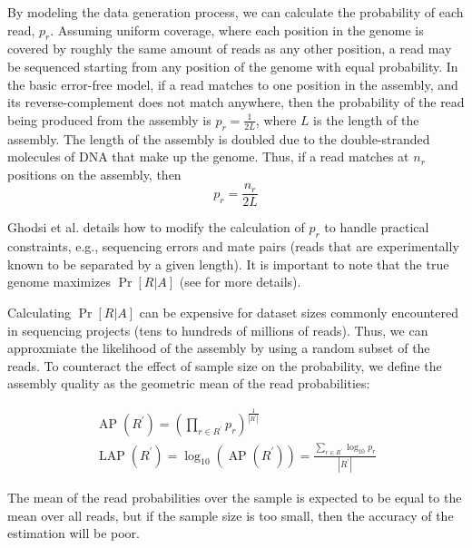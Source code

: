 \documentclass[conference]{IEEEtran}
\begin{document}
By modeling the data generation process, we can calculate the probability of each read, $p_r$.
Assuming uniform coverage, where each position in the genome is covered by roughly the same amount of reads as any other position, a read may be sequenced starting from any position of the genome with equal probability.
In the basic error-free model, if a read matches to one position in the assembly, and its reverse-complement does not match anywhere, then the probability of the read being produced from the assembly is $p_r=\frac{1}{2L}$, where $L$ is the length of the assembly.
The length of the assembly is doubled due to the double-stranded molecules of DNA that make up the genome.
Thus, if a read 
matches at $n_r$ positions on the assembly, then
\begin{equation}
  \label{error_free_probability}
  p_r = \frac{n_r}{2L}
\end{equation}

Ghodsi et al. details how to modify the calculation of $p_r$ to handle practical constraints, e.g., sequencing errors and mate pairs (reads that are experimentally known to be separated by a given length).
It is important to note that the true genome maximizes $\Pr[R|A]$ (see \cite{LAP} for more details).

Calculating $\Pr[R|A]$ can be expensive for dataset sizes commonly encountered in sequencing projects (tens to hundreds of millions of reads).
Thus, we can approxmiate the likelihood of the assembly by using a random subset of the reads.
To counteract the effect of sample size on the probability, we define the assembly quality as the geometric mean of the read probabilities:

\begin{align}
\label{average_log_probability}
  \operatorname{AP}(R^\prime) = 
  \left(\prod_{r \in R^\prime} p_r\right)^{\frac{1}{\left|R^\prime\right|}} \nonumber  \\
  \operatorname{LAP}(R^\prime) = \log_{10} \left( \operatorname{AP}(R^\prime) \right) = \frac{\sum_{r \in R^\prime} \log_{10} p_r}{\left|R^\prime\right|}
\end{align}

The mean of the read probabilities over the sample is expected to be equal to the mean over all reads, but if the sample size is too small, then the accuracy of the estimation will be poor.
\end{document}
